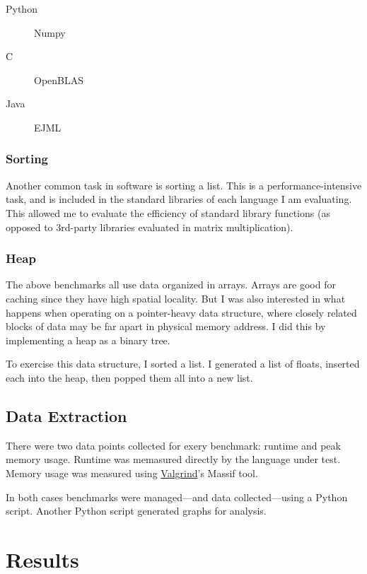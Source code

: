 \documentclass[12pt,letterpaper]{article}
\begin{document}
\begin{description}
	\item [Python] Numpy
	\item [C] OpenBLAS
	\item [Java] EJML
\end{description}

\subsubsection{Sorting}

Another common task in software is sorting a list. This is a
performance-intensive task, and is included in the standard libraries of each
language I am evaluating. This allowed me to evaluate the efficiency of standard
library functions (as opposed to 3rd-party libraries evaluated in matrix
multiplication).

\subsubsection{Heap}

The above benchmarks all use data organized in arrays. Arrays are good for
caching since they have high spatial locality. But I was also interested in
what happens when operating on a pointer-heavy data structure, where closely
related blocks of data may be far apart in physical memory address. I did this
by implementing a heap as a binary tree.

To exercise this data structure, I sorted a list. I generated a list of
floats, inserted each into the heap, then popped them all into a new list.

\subsection{Data Extraction}

There were two data points collected for exery benchmark: runtime and peak
memory usage. Runtime was memasured directly by the language under test. Memory
usage was measured using \href{https://valgrind.org/}{Valgrind}'s Massif tool.

In both cases benchmarks were managed—and data collected—using a Python
script. Another Python script generated graphs for analysis.

\section{Results}
\end{document}
